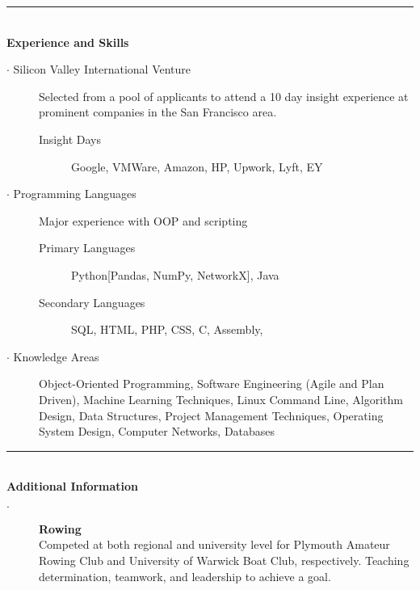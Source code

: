 \documentclass[12pt, a4paper]{article}
\begin{document}
\vspace{-2ex}
\noindent\rule{8cm}{0.4pt} \\
\textbf{Experience and Skills}
  \begin{description}
    \item[$\cdot$ Silicon Valley International Venture] Selected from a pool of applicants to attend a 10 day insight experience at prominent companies in the San Francisco area.
    \begin{description}
      \item[Insight Days] Google, VMWare, Amazon, HP, Upwork, Lyft, EY
    \end{description}
    \item[$\cdot$ Programming Languages] Major experience with OOP and scripting
    \begin{description}
      \item[Primary Languages] Python[Pandas, NumPy, NetworkX], Java
      \item[Secondary Languages] SQL, HTML, PHP, CSS, C, Assembly,
    \end{description}
    \item[$\cdot$ Knowledge Areas] Object-Oriented Programming, 
		Software Engineering (Agile and Plan Driven), 
		  Machine Learning Techniques, 
		  Linux Command Line, 
		  Algorithm Design, 
		  Data Structures,
      Project Management Techniques, 
		  Operating System Design, 
		  Computer Networks, 
		  Databases
  \end{description}

\vspace{-2ex}
\noindent\rule{8cm}{0.4pt} \\

\textbf{Additional Information}
  \begin{description}
    \item[$\cdot$] \textbf{Rowing} \\Competed at both regional and university level for Plymouth Amateur Rowing Club and University of Warwick Boat Club, respectively. Teaching determination, teamwork, and leadership to achieve a goal.

    \iffalse
    Rowing has taught me the value of team work, and has given me transferable skills including resilience, decision making, and precision, all of which I bring to the workplace.
    Time management $\cdot$ Team work $\cdot$ Resilience $\cdot$ Motivational skills $\cdot$ Quick thinking \\ $\cdot$ Technical planning $\cdot$ Precision
    \fi
  \end{description}
\end{document}
